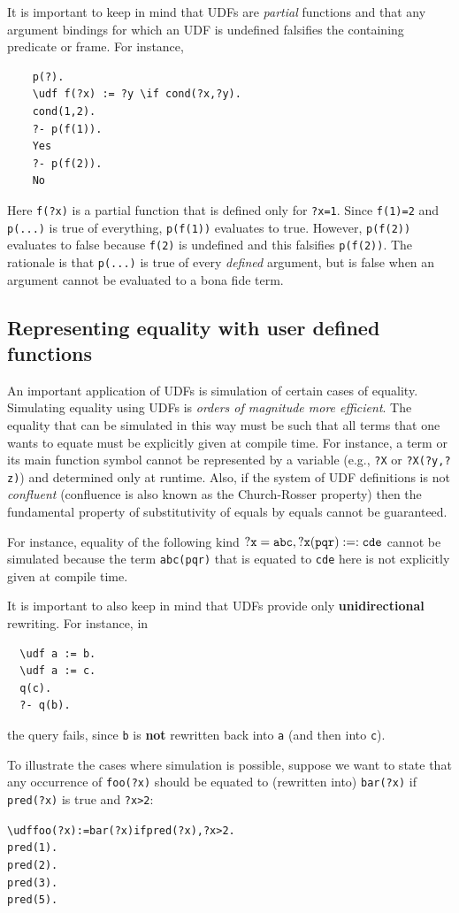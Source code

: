 \documentclass[11pt]{article}
\newcommand{\bs}{\textbackslash}
\begin{document}
It is important to keep in mind that UDFs are \emph{partial} functions and
that any argument bindings for which an UDF is undefined falsifies the
containing predicate or frame. For instance,
\begin{verbatim}
    p(?).
    \udf f(?x) := ?y \if cond(?x,?y).
    cond(1,2).
    ?- p(f(1)).
    Yes
    ?- p(f(2)).
    No
\end{verbatim}
Here \texttt{f(?x)} is a partial function that is defined only for
\texttt{?x=1}. Since \texttt{f(1)=2} and \texttt{p(...)} is true of everything,
\texttt{p(f(1))} evaluates to true. However,  \texttt{p(f(2))} evaluates to
false because \texttt{f(2)} is undefined and this falsifies
\texttt{p(f(2))}. The rationale is that \texttt{p(...)} is true of every
\emph{defined} argument, but is false when an argument cannot be evaluated
to a bona fide term.


\subsection{Representing equality with user defined functions}

An important application of UDFs is simulation of certain cases of
equality.
Simulating equality using UDFs is \emph{orders of magnitude more
  efficient}.  
The equality that can be simulated in this way must be such
that all terms that one wants to equate must be explicitly given at
compile time. For instance, a term or its main function symbol cannot be
represented by a variable (e.g., \texttt{?X} or \texttt{?X(?y,?z)})  and
determined only at runtime.
Also, if the system of UDF definitions is not \emph{confluent} 
(confluence is also known as the Church-Rosser property) then
the fundamental property of
substitutivity of equals by equals cannot be guaranteed.


For instance, equality of the following kind $\tt ?x=abc, ?x(pqr) :=: cde$
cannot be simulated because the term \texttt{abc(pqr)} that is equated to
\texttt{cde} here is not explicitly given at compile time.  

It is important to also keep in mind that UDFs provide only \textbf{unidirectional}
rewriting. For instance, in
\begin{verbatim}
  \udf a := b.
  \udf a := c.
  q(c).
  ?- q(b).
\end{verbatim}
the query fails, since \texttt{b} is \textbf{not} rewritten back into \texttt{a}
(and then into \texttt{c}).   

To illustrate the cases where simulation is possible, suppose we want to
state that any occurrence of \texttt{foo(?x)} should be equated to (rewritten
into) \texttt{bar(?x)} if \texttt{pred(?x)} is true and \texttt{?x>2}: 
\begin{alltt}
    \bs{}udf foo(?x):=bar(?x) if  pred(?x), ?x>2.
    pred(1).
    pred(2).
    pred(3).
    pred(5).
\end{alltt}
\end{document}
